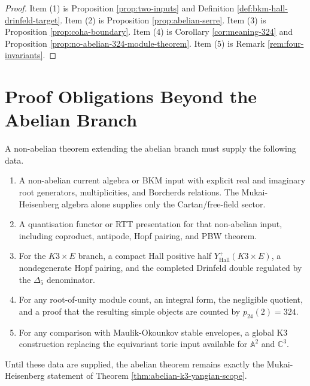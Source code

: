 \documentclass[11pt]{article}
\theoremstyle{definition}
\theoremstyle{remark}
\begin{document}
\begin{proof}
Item (1) is Proposition \ref{prop:two-inputs} and Definition
\ref{def:bkm-hall-drinfeld-target}. Item (2) is Proposition
\ref{prop:abelian-serre}. Item (3) is Proposition
\ref{prop:coha-boundary}. Item (4) is Corollary
\ref{cor:meaning-324} and Proposition
\ref{prop:no-abelian-324-module-theorem}. Item (5) is Remark
\ref{rem:four-invariants}.
\end{proof}

\section{Proof Obligations Beyond the Abelian Branch}
\label{sec:proof-obligations}

A non-abelian theorem extending the abelian branch must supply the
following data.

\begin{enumerate}[label=\textup{(\arabic*)}]
\item A non-abelian current algebra or BKM input with explicit real
and imaginary root generators, multiplicities, and Borcherds
relations. The Mukai-Heisenberg algebra alone supplies only the
Cartan/free-field sector.
\item A quantisation functor or RTT presentation for that non-abelian
input, including coproduct, antipode, Hopf pairing, and PBW theorem.
\item For the $K3\times E$ branch, a compact Hall positive half
$Y^+_{\mathrm{Hall}}(K3\times E)$, a nondegenerate Hopf pairing, and
the completed Drinfeld double regulated by the $\Delta_5$ denominator.
\item For any root-of-unity module count, an integral form, the
negligible quotient, and a proof that the resulting simple objects are
counted by $p_{24}(2)=324$.
\item For any comparison with Maulik-Okounkov stable envelopes, a
global K3 construction replacing the equivariant toric input available
for $\mathbb{A}^2$ and $\mathbb{C}^3$.
\end{enumerate}

Until these data are supplied, the abelian theorem remains exactly the
Mukai-Heisenberg statement of Theorem
\ref{thm:abelian-k3-yangian-scope}.
\end{document}
